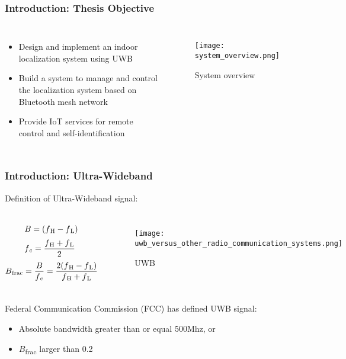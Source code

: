 \documentclass[10pt]{beamer}
\begin{document}
\begin{frame}
    \frametitle{Introduction: Thesis Objective}    
    \begin{columns}
    \begin{itemize}
        \item Design and implement an indoor localization system using UWB
        \item Build a system to manage and control the localization system based on Bluetooth mesh network
        \item Provide IoT services for remote control and self-identification
    \end{itemize}
    \begin{figure}[H]
        \texttt{[image: system\_overview.png]}
        \caption{System overview}
        \label{fig:system_overview}
    \end{figure}
    \end{columns}
\end{frame}

\begin{frame}
    \frametitle{Introduction: Ultra-Wideband}
    Definition of Ultra-Wideband signal:
\begin{columns}
    \begin{equation}
        B=(f\textsubscript{H} - f\textsubscript{L})
    \end{equation}
    \begin{equation}
        f\textsubscript{c} = \frac{f\textsubscript{H} + f\textsubscript{L}}{2}\
    \end{equation} 
    \begin{equation}
        B\textsubscript{frac} =\frac{B}{f\textsubscript{c}} = \frac{2(f\textsubscript{H} - f\textsubscript{L})}{f\textsubscript{H} + f\textsubscript{L}}
    \end{equation}
    \begin{figure}[H]
    \centering
    \texttt{[image: uwb\_versus\_other\_radio\_communication\_systems.png]}
    \caption{UWB}
    \label{fig:uwb_versus_other_radio_communication_systems}
    \end{figure}
\end{columns}
Federal Communication Commission (FCC) has defined UWB signal:
\begin{itemize} 
    \item Absolute bandwidth greater than or equal 500Mhz, or
    \item $B$\textsubscript{frac} larger than 0.2
\end{itemize}
\end{frame}
\end{document}
